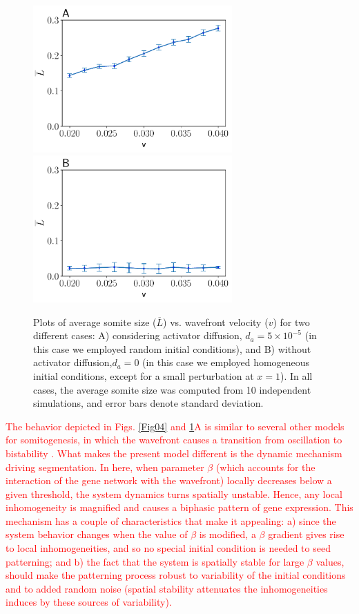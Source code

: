 \documentclass[%
 preprint,
 aip, 
 amsmath,amssymb,
]{revtex4-2}
\begin{document}
\begin{figure}
	\centering
	\includegraphics[width=3in]{Figures/Fig04_1a} 
	\includegraphics[width=3in]{Figures/Fig04_1b}
	\caption{Plots of average somite size ($\overline{L}$) vs. wavefront velocity ($v$) for two different cases: A) considering activator diffusion, $d_a = 5\times10^{-5}$ (in this case we employed random initial conditions), and B) without activator diffusion,$d_a = 0$ (in this case we employed homogeneous initial conditions, except for a small perturbation at $x=1$). In all cases, the average somite size was computed from 10 independent simulations, and error bars denote standard deviation.}
	\label{Fig04_1}
\end{figure}

\textcolor{red}{The behavior depicted in Figs. \ref{Fig04} and \ref{Fig04_1}A is similar to several other models for somitogenesis, in which the wavefront causes a transition from oscillation to bistability \cite{Francois2007}. What makes the present model different is the dynamic mechanism driving segmentation. In here, when parameter $\beta$ (which accounts for the interaction of the gene network with the wavefront) locally decreases below a given threshold, the system dynamics turns spatially unstable. Hence, any local inhomogeneity is magnified and causes a biphasic pattern of gene expression. This mechanism has a couple of characteristics that make it appealing: a) since the system behavior changes when the value of $\beta$ is modified, a $\beta$ gradient gives rise to local inhomogeneities, and so no special initial condition is needed to seed patterning; and b) the fact that the system is spatially stable for large $\beta$ values, should make the patterning process robust to variability of the initial conditions and to added random noise (spatial stability attenuates the inhomogeneities induces by these sources of variability).}
	
\end{document}
